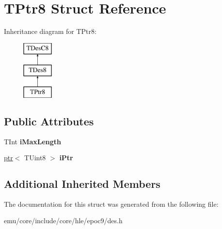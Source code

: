 \hypertarget{struct_t_ptr8}{}\section{T\+Ptr8 Struct Reference}
\label{struct_t_ptr8}
Inheritance diagram for T\+Ptr8\+:\begin{figure}[H]
\begin{center}
\leavevmode
\includegraphics[height=3.000000cm]{struct_t_ptr8}
\end{center}
\end{figure}
\subsection*{Public Attributes}
\begin{DoxyCompactItemize}
\item 
\mbox{\label{struct_t_ptr8_abd414b9f39cb0a1ce90612a2054ca0cf}} 
T\+Int {\bfseries i\+Max\+Length}
\item 
\mbox{\label{struct_t_ptr8_a77b332a98f7b2ba47c3ae679f24c536b}} 
\mbox{\hyperlink{classeka2l1_1_1ptr}{ptr}}$<$ T\+Uint8 $>$ {\bfseries i\+Ptr}
\end{DoxyCompactItemize}
\subsection*{Additional Inherited Members}


The documentation for this struct was generated from the following file\+:\begin{DoxyCompactItemize}
\item 
emu/core/include/core/hle/epoc9/des.\+h\end{DoxyCompactItemize}

